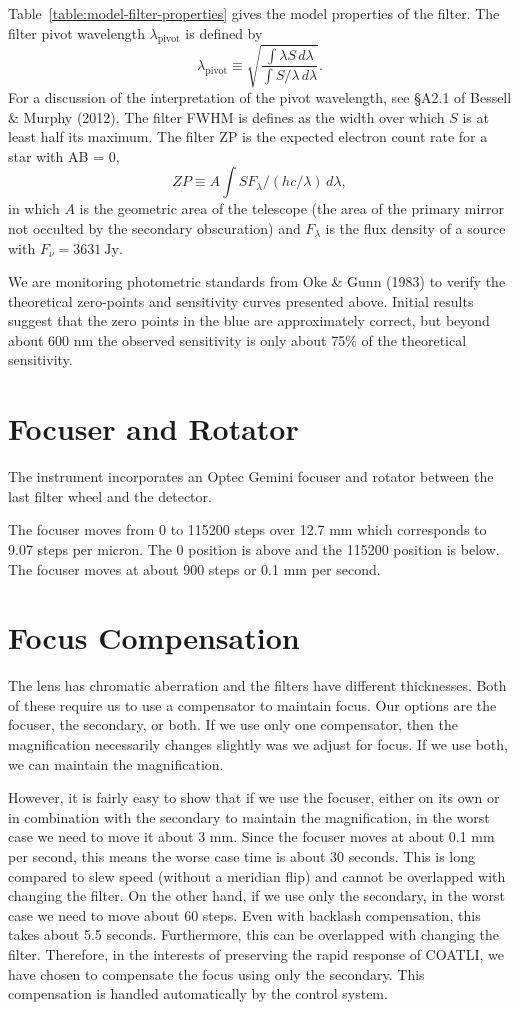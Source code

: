 Table~\ref{table:model-filter-properties} gives the model properties of the filter. The filter pivot wavelength $\lambda_\mathrm{pivot}$ is  defined by 
$$
\lambda_\mathrm{pivot} \equiv \sqrt{\frac{\int \lambda S\,d\lambda}{\int S/\lambda\, d\lambda}}.
$$
For a discussion of the interpretation of the pivot wavelength, see \S A2.1 of Bessell \& Murphy (2012).
The filter FWHM is defines as the width over which $S$ is at least half its maximum. The filter ZP is the expected electron count rate for a star with AB = 0,
$$
ZP \equiv A \int S F_\lambda / (hc/\lambda)\, d\lambda,
$$
in which $A$ is the geometric area of the telescope (the area of the primary mirror not occulted by the secondary obscuration) and $F_\lambda$ is the flux density of a source with $F_\nu = \mathrm{3631~Jy}$.

We are monitoring photometric standards from Oke \& Gunn (1983) to verify the theoretical zero-points and sensitivity curves presented above. Initial results suggest that the zero points in the blue are approximately correct, but beyond about 600 nm the observed sensitivity is only about 75\% of the theoretical sensitivity.

\section{Focuser and Rotator}

The instrument incorporates an Optec Gemini focuser and rotator between the last filter wheel and the detector.

The focuser moves from 0 to 115200 steps over 12.7 mm which corresponds to 9.07 steps per micron. The 0 position is above and the 115200 position is below. The focuser moves at about 900 steps or 0.1 mm per second.

\section{Focus Compensation}

The lens has chromatic aberration and the filters have different thicknesses. Both of these require us to use a compensator to maintain focus. Our options are the focuser, the secondary, or both. If we use only one compensator, then the magnification necessarily changes slightly was we adjust for focus. If we use both, we can maintain the magnification. 

However, it is fairly easy to show that if we use the focuser, either on its own or in combination with the secondary to maintain the magnification, in the worst case we need to move it about 3 mm. Since the focuser moves at about 0.1 mm per second, this means the worse case time is about 30 seconds. This is long compared to slew speed (without a meridian flip) and cannot be overlapped with changing the filter.  On the other hand, if we use only the secondary, in the worst case we need to move about 60 steps. Even with backlash compensation, this takes about 5.5 seconds. Furthermore, this can be overlapped with changing the filter. Therefore, in the interests of preserving the rapid response of COATLI, we have chosen to compensate the focus using only the secondary. This compensation is handled automatically by the control system.

